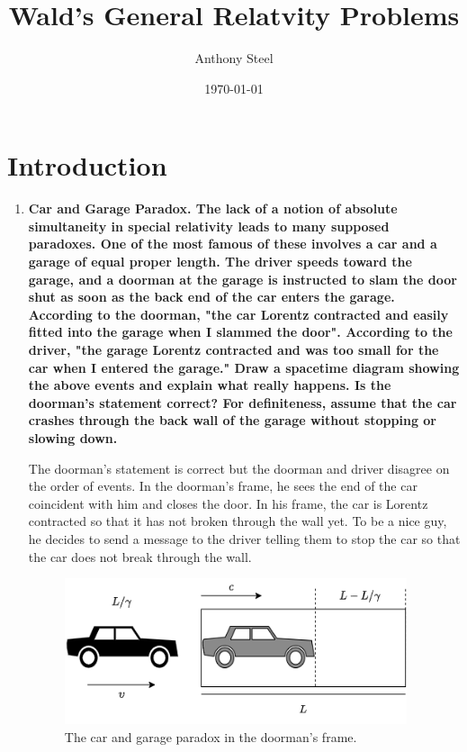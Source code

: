 \documentclass[9pt]{report}
\begin{document}
\title{Wald's General Relatvity Problems}
\author{Anthony Steel}
\date{\today}
\maketitle
\chapter{Introduction}
\begin{enumerate}
  \item \textbf{Car and Garage Paradox. The lack of a notion of absolute
      simultaneity in special relativity leads to many supposed paradoxes. One
      of the most famous of these involves a car and a garage of equal proper
      length. The driver speeds toward the garage, and a doorman at the garage
      is instructed to slam the door shut as soon as the back end of the car
      enters the garage. According to the doorman, "the car Lorentz contracted
      and easily fitted into the garage when I slammed the door". According to
      the driver, "the garage Lorentz contracted and was too small for the car
      when I entered the garage." Draw a spacetime diagram showing the above
      events and explain what really happens. Is the doorman's statement
      correct? For definiteness, assume that the car crashes through the
      back wall of the garage without stopping or slowing down.}

      The doorman's statement is correct but the doorman and
      driver disagree on the order of events. In the doorman's frame, he sees
      the end of the car coincident with him and closes the door. In his frame,
      the car is Lorentz contracted so that it has not broken through the wall yet.
      To be a nice guy, he decides to send a message to the driver telling them
      to stop the car so that the car does not break through the wall.

      \begin{figure}
        \includegraphics[width=0.95\textwidth]{images/carandgarageparadox.png}
        \caption{The car and garage paradox in the doorman's frame.}
        \label{doorman}
      \end{figure}


\end{enumerate}
\end{document}

